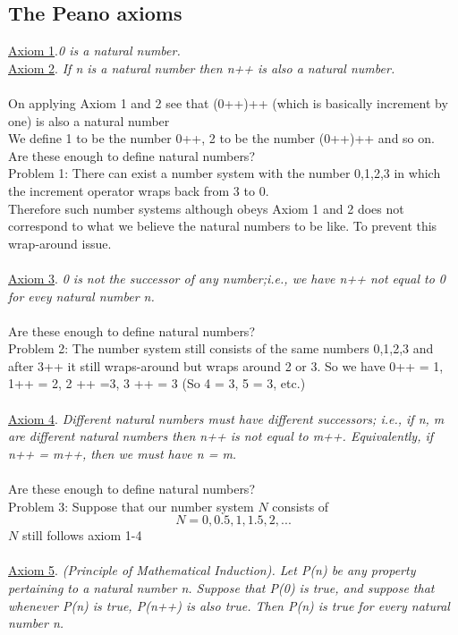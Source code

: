 \documentclass{article}
\begin{document}
\subsection*{The Peano axioms}
\underline{Axiom 1}.\emph{0 is a natural number.}
\\\underline{Axiom 2}. \emph{If n is a natural number then n++ is also a natural number.}
\\\\On applying Axiom 1 and 2 see that (0++)++ (which is basically increment by one) is also a natural number
\\We define 1 to be the number 0++, 2 to be the number (0++)++ and so on.
\\ Are these enough to define natural numbers?
\\Problem 1: There can exist a number system with the number 0,1,2,3 in which the increment operator wraps back from 3 to 0.
\\Therefore such number systems although obeys Axiom 1 and 2 does not correspond to what we believe the natural numbers to be like.
To prevent this wrap-around issue.
\\\\
\underline{Axiom 3}. \emph{0 is not the successor of any number;i.e., we have n++ not equal to 0 for evey natural number n.}
\\\\ Are these enough to define natural numbers?
\\Problem 2: The number system still consists of the same numbers 0,1,2,3 and after 3++ it still wraps-around but wraps around 2 or 3. So we have 0++ = 1, 1++ = 2, 2 ++ =3, 3 ++ = 3 (So 4 = 3, 5 = 3, etc.)
\\\\
\underline{Axiom 4}. \emph{Different natural numbers must have different successors; i.e., if n, m are different natural numbers then n++ is not equal to m++. Equivalently, if n++ = m++, then we must have n = m.}
\\\\Are these enough to define natural numbers?
\\Problem 3: Suppose that our number system $N$ consists of $$N = 0,0.5,1,1.5,2,...$$
$N$ still follows axiom 1-4
\\\\
\underline{Axiom 5}. \emph{(Principle of Mathematical Induction). Let P(n) be any property pertaining to a natural number n. Suppose that P(0) is true, and suppose  that whenever P(n) is true, P(n++) is also true. Then P(n) is true for every natural number n.}
\end{document}
